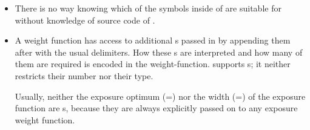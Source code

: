 \begin{itemize}
\begin{restrictedmaterial}{OS~X}
    \begin{enumerate}
    \item {},
    \item {},
    \item current working directory, and finally
    \item {}.
    \end{enumerate}

    For details of the search algorithm please consult the manual page of .
  \end{restrictedmaterial}

  \smallskip

  \begin{restrictedmaterial}{Windows}
    If  specifies an absolute filename, exactly this file is used.
    Otherwise \App{} searches in the following directories and in this order:

    \begin{enumerate}
    \item The directory from which \appcmd{} is loaded.
    \item The system directory.
    \item The Windows directory.
    \item The current directory.
    \item The directories that are listed in the ~environment variable.
    \end{enumerate}

    For details consult the manual page of LoadLibrary.
  \end{restrictedmaterial}

\item
  There is no way knowing which of the symbols inside of  are suitable for  without knowledge of source code of
  .

\item
  A weight function has access to additional s passed in by appending them
  after  with the usual delimiters.  How these s are
  interpreted and how many of them are required is encoded in the weight-function.  \App{}
  supports s; it neither restricts their number nor their type.

  \begin{geeknote}%
    Usually, neither the exposure optimum
    (=\feasiblebreak{}) nor the width
    (=\feasiblebreak{}) of the exposure function are
    s, because they are always explicitly passed on to any exposure weight
    function.
  \end{geeknote}


\end{itemize}
